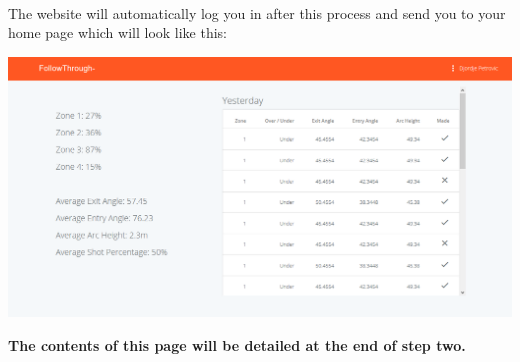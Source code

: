 \\The website will automatically log you in after this process and send you to your home page which will look like this:

\begin{center}
    \includegraphics[width = 1 \textwidth]{Pieces/data.PNG}
\end{center}

\textbf{The contents of this page will be detailed at the end of step two.}
